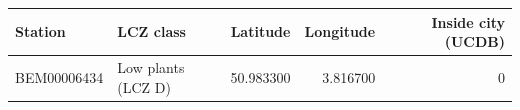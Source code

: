 \begin{tabular}{llrrr}
\toprule
Station & LCZ class & Latitude & Longitude & Inside city (UCDB) \\
\midrule
BEM00006434 & Low plants (LCZ D) & 50.983300 & 3.816700 & 0 \\
\bottomrule
\end{tabular}
